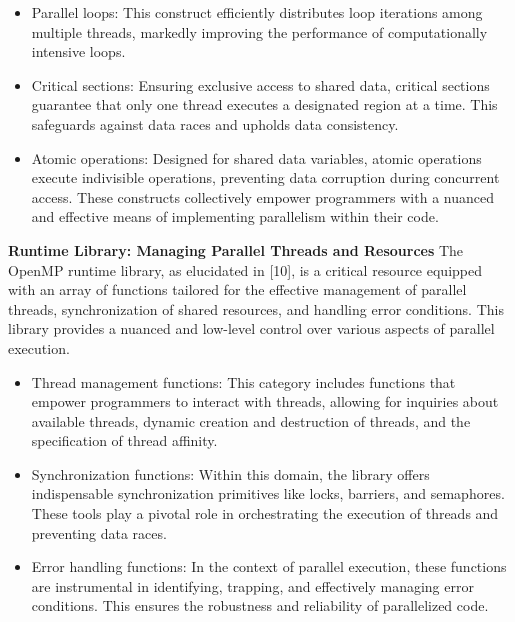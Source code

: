\documentclass[12pt,conference]{IEEEtran}
\begin{document}
\begin{itemize}
    \item Parallel loops: This construct efficiently distributes loop iterations among multiple threads, markedly improving the performance of computationally intensive loops.
\end{itemize}

\begin{itemize}
    \item Critical sections: Ensuring exclusive access to shared data, critical sections guarantee that only one thread executes a designated region at a time. This safeguards against data races and upholds data consistency.
\end{itemize}

\begin{itemize}
    \item Atomic operations: Designed for shared data variables, atomic operations execute indivisible operations, preventing data corruption during concurrent access. These constructs collectively empower programmers with a nuanced and effective means of implementing parallelism within their code.
\end{itemize}
\textbf{Runtime Library: Managing Parallel Threads and Resources}
The OpenMP runtime library, as elucidated in [10], is a critical resource equipped with an array of functions tailored for the effective management of parallel threads, synchronization of shared resources, and handling error conditions. This library provides a nuanced and low-level control over various aspects of parallel execution.

\begin{itemize}
    \item Thread management functions: This category includes functions that empower programmers to interact with threads, allowing for inquiries about available threads, dynamic creation and destruction of threads, and the specification of thread affinity.
\end{itemize}

\begin{itemize}
    \item Synchronization functions: Within this domain, the library offers indispensable synchronization primitives like locks, barriers, and semaphores. These tools play a pivotal role in orchestrating the execution of threads and preventing data races.
\end{itemize}

\begin{itemize}
    \item Error handling functions: In the context of parallel execution, these functions are instrumental in identifying, trapping, and effectively managing error conditions. This ensures the robustness and reliability of parallelized code.
\end{itemize}
\end{document}
